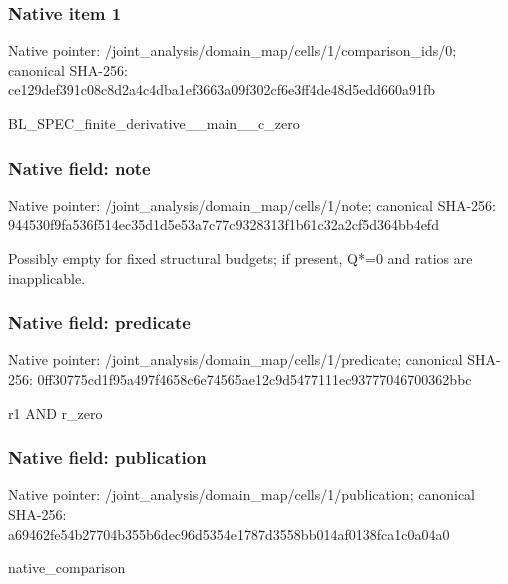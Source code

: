 \documentclass[10pt,a4paper]{article}
\begin{document}
\subsubsection{Native item 1}
Native pointer: /joint\_\allowbreak{}analysis/domain\_\allowbreak{}map/cells/1/comparison\_\allowbreak{}ids/0; canonical SHA-256: ce129def391c08c8d2a4c4dba1ef3663a09f302cf6e3ff4de48d5edd660a91fb

\begingroup\raggedright\sloppy BL\_\allowbreak{}SPEC\_\allowbreak{}finite\_\allowbreak{}derivative\_\allowbreak{}\_\allowbreak{}main\_\allowbreak{}\_\allowbreak{}c\_\allowbreak{}zero\par\endgroup

\subsubsection{Native field: note}
Native pointer: /joint\_\allowbreak{}analysis/domain\_\allowbreak{}map/cells/1/note; canonical SHA-256: 944530f9fa536f514ec35d1d5e53a7c77c9328313f1b61c32a2cf5d364bb4efd

\begingroup\raggedright\sloppy Possibly empty for fixed structural budgets;\allowbreak{} if present,\allowbreak{} Q*=\allowbreak{}0 and ratios are inapplicable.\par\endgroup

\subsubsection{Native field: predicate}
Native pointer: /joint\_\allowbreak{}analysis/domain\_\allowbreak{}map/cells/1/predicate; canonical SHA-256: 0ff30775cd1f95a497f4658c6e74565ae12c9d5477111ec93777046700362bbc

\begingroup\raggedright\sloppy r1 AND r\_\allowbreak{}zero\par\endgroup

\subsubsection{Native field: publication}
Native pointer: /joint\_\allowbreak{}analysis/domain\_\allowbreak{}map/cells/1/publication; canonical SHA-256: a69462fe54b27704b355b6dec96d5354e1787d3558bb014af0138fca1c0a04a0

\begingroup\raggedright\sloppy native\_\allowbreak{}comparison\par\endgroup
\end{document}
